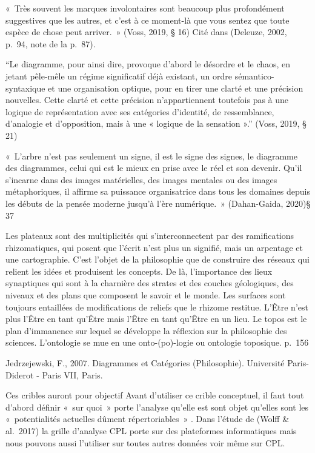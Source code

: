 \documentclass[
  a4paper,
  DIV=11,
  numbers=noendperiod]{scrreprt}
\begin{document}
«~Très souvent les marques involontaires sont beaucoup plus profondément
suggestives que les autres, et c'est à ce moment-là que vous sentez que
toute espèce de chose peut arriver.~» (Voss, 2019, § 16) Cité dans
(Deleuze, 2002, p.~94, note de la p.~87).

``Le diagramme, pour ainsi dire, provoque d'abord le désordre et le
chaos, en jetant pêle-mêle un régime significatif déjà existant, un
ordre sémantico-syntaxique et une organisation optique, pour en tirer
une clarté et une précision nouvelles. Cette clarté et cette précision
n'appartiennent toutefois pas à une logique de représentation avec ses
catégories d'identité, de ressemblance, d'analogie et d'opposition, mais
à une « logique de la sensation ».'' (Voss, 2019, § 21)

«~L'arbre n'est pas seulement un signe, il est le signe des signes, le
diagramme des diagrammes, celui qui est le mieux en prise avec le réel
et son devenir. Qu'il s'incarne dans des images matérielles, des images
mentales ou des images métaphoriques, il affirme sa puissance
organisatrice dans tous les domaines depuis les débuts de la pensée
moderne jusqu'à l'ère numérique.~» (Dahan-Gaida, 2020)§ 37

Les plateaux sont des multiplicités qui s'interconnectent par des
ramifications rhizomatiques, qui posent que l'écrit n'est plus un
signifié, mais un arpentage et une cartographie. C'est l'objet de la
philosophie que de construire des réseaux qui relient les idées et
produisent les concepts. De là, l'importance des lieux synaptiques qui
sont à la charnière des strates et des couches géologiques, des niveaux
et des plans que composent le savoir et le monde. Les surfaces sont
toujours entaillées de modifications de reliefs que le rhizome restitue.
L'Être n'est plus l'Être en tant qu'Être mais l'Être en tant qu'Être en
un lieu. Le topos est le plan d'immanence sur lequel se développe la
réflexion sur la philosophie des sciences. L'ontologie se mue en une
onto-(po)-logie ou ontologie toposique. p.~156

Jedrzejewski, F., 2007. Diagrammes et Catégories (Philosophie).
Université Paris-Diderot - Paris VII, Paris.

Ces cribles auront pour objectif Avant d'utiliser ce crible conceptuel,
il faut tout d'abord définir «~sur quoi~» porte l'analyse qu'elle est
sont objet qu'elles sont les «~potentialités actuelles dûment
répertoriables~» . Dans l'étude de (Wolff \& al.~2017) la grille
d'analyse CPL porte sur des plateformes informatiques mais nous pouvons
aussi l'utiliser sur toutes autres données voir même sur CPL.
\end{document}
